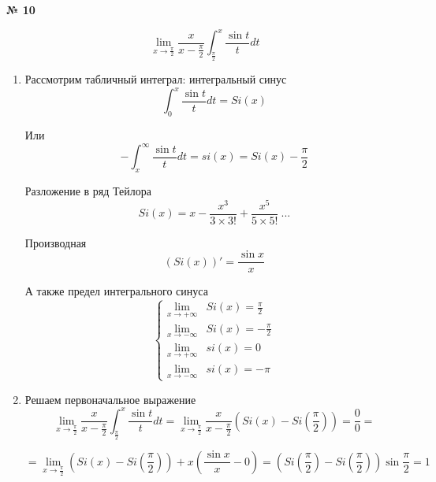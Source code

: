 \documentclass{article}
\begin{document}
\textbf{№ 10} 
\large

$$ \lim\limits_{x \to \frac{\pi}{2}} \frac{x}{x-\frac{\pi}{2}} \int_{\frac{\pi}{2}}^{x} \frac{\sin{t}}{t}dt $$ 

\begin{enumerate}
\item Рассмотрим табличный интеграл: интегральный синус
$$ \int_{0}^{x} \frac{\sin{t}}{t}dt 
= Si(x) $$

Или
$$ -\int_{x}^{\infty} \frac{\sin{t}}{t}dt 
= si(x) 
= Si(x) - \frac{\pi}{2}$$

Разложение в ряд Тейлора
$$ Si(x)
= x - \frac{x^3}{3\times3!} + \frac{x^5}{5\times5!} \ ...$$

Производная
$$ \left( Si(x) \right)'
= \frac{\sin{x}}{x} $$

А также предел интегрального синуса
$$ 
\begin{cases}
 \lim\limits_{x \to +\infty} &Si(x) = \frac{\pi}{2}\\
 \lim\limits_{x \to -\infty} &Si(x) = -\frac{\pi}{2}\\
 \lim\limits_{x \to +\infty} &si(x) = 0\\
 \lim\limits_{x \to -\infty} &si(x) = -\pi
\end{cases}
$$

\item Решаем первоначальное выражение
$$ \lim\limits_{x \to \frac{\pi}{2}} \frac{x}{x-\frac{\pi}{2}} \int_{\frac{\pi}{2}}^{x} \frac{\sin{t}}{t}dt
= \lim\limits_{x \to \frac{\pi}{2}} \frac{x}{x-\frac{\pi}{2}} \left( Si(x) - Si(\frac{\pi}{2}) \right)
= \frac{0}{0}
= $$

$$ = \lim\limits_{x \to \frac{\pi}{2}} \left( Si(x) - Si(\frac{\pi}{2}) \right) + x \left( \frac{\sin{x}}{x} - 0 \right)
= \left( Si(\frac{\pi}{2}) - Si(\frac{\pi}{2}) \right) \sin{\frac{\pi}{2}}
= 1 $$

\end{enumerate}
\end{document}
